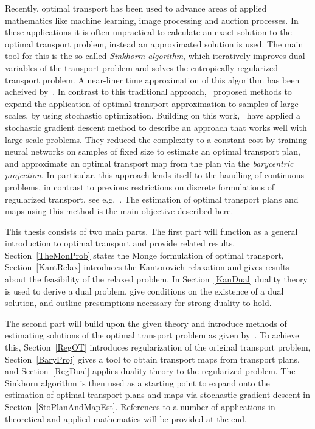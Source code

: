 Recently, optimal transport has been used to advance areas of applied mathematics like machine learning, image processing and auction processes. In these applications it is often unpractical to calculate an exact solution to the optimal transport problem, instead an approximated solution is used. The main tool for this is the so-called \textit{Sinkhorm algorithm}, which iteratively improves dual variables of the transport problem and solves the entropically regularized transport problem. A near-liner time approximation of this algorithm has been acheived by\ \cite{Alts2019}. In contrast to this traditional approach,\ \cite{Gene2016} proposed methods to expand the application of optimal transport approximation to samples of large scales, by using stochastic optimization. Building on this work,\ \cite{Seg2018} have applied a stochastic gradient descent method to describe an approach that works well with large-scale problems. They reduced the complexity to a constant cost by training neural networks on samples of fixed size to estimate an optimal transport plan, and approximate an optimal transport map from the plan via the \textit{barycentric projection}. In particular, this approach lends itself to the handling of continuous problems, in contrast to previous restrictions on discrete formulations of regularized transport, see e.g.\ \cite{Ferra2013}. The estimation of optimal transport plans and maps using this method is the main objective described here.

This thesis consists of two main parts. The first part will function as a general introduction to optimal transport and provide related results. Section~\ref{TheMonProb} states the Monge formulation of optimal transport, Section~\ref{KantRelax} introduces the Kantorovich relaxation and gives results about the feasibility of the relaxed problem. In Section~\ref{KanDual} duality theory is used to derive a dual problem, give conditions on the existence of a dual solution, and outline presumptions necessary for strong duality to hold.

The second part will build upon the given theory and introduce methods of estimating solutions of the optimal transport problem as given by\ \cite{Seg2018}. To achieve this, Section~\ref{RegOT} introduces regularization of the original transport problem, Section~\ref{BaryProj} gives a tool to obtain transport maps from transport plans, and Section~\ref{RegDual} applies duality theory to the regularized problem. The Sinkhorn algorithm is then used as a starting point to expand onto the estimation of optimal transport plans and maps via stochastic gradient descent in Section~\ref{StoPlanAndMapEst}. References to a number of applications in theoretical and applied mathematics will be provided at the end.
